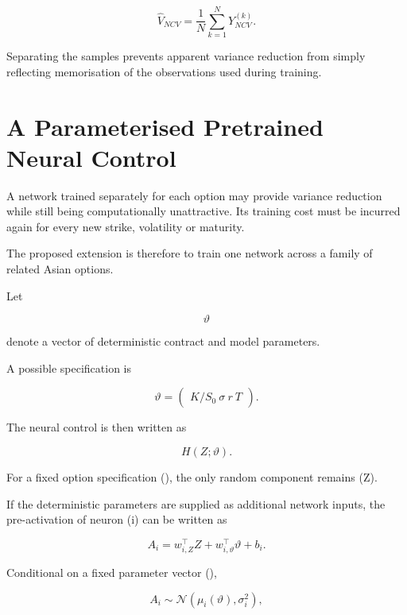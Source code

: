 \documentclass[12pt,a4paper]{report}
\begin{document}
\begin{equation}
\widehat V_{NCV}
=
\frac{1}{N}
\sum_{k=1}^{N}
Y^{(k)}_{NCV}.
\end{equation}

Separating the samples prevents apparent variance reduction from simply reflecting memorisation of the observations used during training.

\section{A Parameterised Pretrained Neural Control}

A network trained separately for each option may provide variance reduction while still being computationally unattractive. Its training cost must be incurred again for every new strike, volatility or maturity.

The proposed extension is therefore to train one network across a family of related Asian options.

Let

\begin{equation}
\vartheta
\end{equation}

denote a vector of deterministic contract and model parameters.

A possible specification is

\begin{equation}
\vartheta
=
\begin{pmatrix}
K/S_0\
\sigma\
r\
T
\end{pmatrix}.
\end{equation}

The neural control is then written as

\begin{equation}
H(Z;\vartheta).
\end{equation}

For a fixed option specification (\vartheta), the only random component remains (Z).

If the deterministic parameters are supplied as additional network inputs, the pre-activation of neuron (i) can be written as

\begin{equation}
A_i
=
w_{i,Z}^{\top}Z
+
w_{i,\vartheta}^{\top}\vartheta
+
b_i.
\end{equation}

Conditional on a fixed parameter vector (\vartheta),

\begin{equation}
A_i
\sim
\mathcal{N}
\left(
\mu_i(\vartheta),
\sigma_i^2
\right),
\end{equation}
\end{document}
